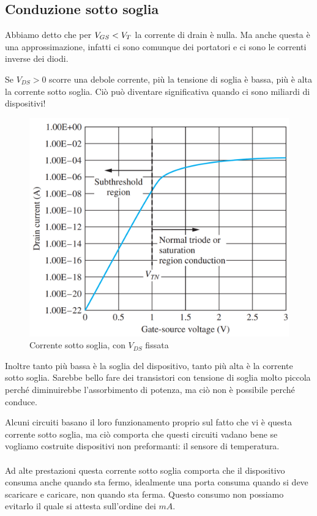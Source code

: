 \newpage
\subsection{Conduzione sotto soglia}
Abbiamo detto che per $V_{GS} < V_{T}$ la	corrente	di	drain	è	nulla. Ma	anche questa è	una	approssimazione,	infatti ci	sono	comunque	dei	portatori		e	ci	sono	le	correnti	inverse	dei	diodi. 

Se $V_{DS} > 0$ scorre una debole corrente, più	la	tensione	di	soglia	è	bassa,	più	è	alta	la	corrente	sotto	
soglia. Ciò può	diventare	significativa	quando	ci sono	miliardi	di	dispositivi!

\begin{figure}[htbp]
    \centering
    \includegraphics[width=0.5\linewidth]{img/corrente_sotto_soglia.png}
    \caption{Corrente sotto soglia, con $V_{DS}$ fissata}
    
\end{figure}


Inoltre tanto più bassa è la soglia del dispositivo, tanto più alta è la corrente sotto soglia. Sarebbe bello fare dei transistori con tensione di soglia molto piccola perché diminuirebbe l'assorbimento di potenza, ma ciò non è possibile perché conduce.

Alcuni circuiti basano il loro funzionamento proprio sul fatto che vi è questa corrente sotto soglia, ma ciò comporta che questi circuiti vadano bene se vogliamo costruite dispositivi non preformanti: il sensore di temperatura.
\paragraph{}
Ad alte prestazioni questa corrente sotto soglia comporta che il dispositivo consuma anche quando sta fermo, idealmente una porta consuma quando si deve scaricare e caricare, non quando sta ferma. Questo consumo non possiamo evitarlo il quale si attesta sull'ordine dei $mA$.






